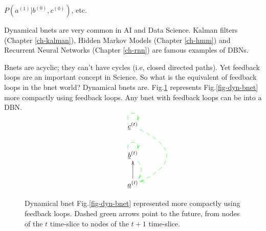 $P(a^{(1)}|b^{(0)}, c^{(0)})$, etc.

Dynamical bnets
are very common
in AI and Data Science.
Kalman filters (Chapter \ref{ch-kalman}),
Hidden Markov Models (Chapter \ref{ch-hmm})
and
Recurrent Neural Networks 
(Chapter \ref{ch-rnn})
are famous examples of DBNs.

Bnets are acyclic; they can't have cycles
(i.e, closed directed paths).
Yet feedback loops are an important
concept in Science. So what is
the equivalent of feedback loops in the
bnet world? Dynamical bnets are.
Fig.\ref{fig-dyn-bnet-compact}
represents
Fig.\ref{fig-dyn-bnet} more 
compactly using feedback loops. 
Any bnet with feedback loops
can be  into a DBN.


\begin{figure}[h!]
$$
\xymatrix{
\rvc^{(t)}
\ar@/^4pc/@[green]@{-->}[dd]
\ar@(ul,ur)@[green]@{-->}[]
\\
\rvb^{(t)}
\ar@/^1pc/@[green]@{-->}[d]
\ar@(ul,ur)@[green]@{-->}[]
\\
\rva^{(t)}\ar[u]
}$$
\caption{
Dynamical bnet Fig.\ref{fig-dyn-bnet}
represented 
more compactly using feedback loops.
Dashed green arrows
point to the future, from nodes of the $t$ time-slice
to nodes of the $t+1$ time-slice.
}
\label{fig-dyn-bnet-compact}
\end{figure}
